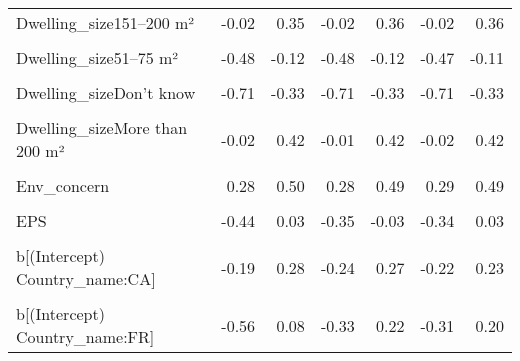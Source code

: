 \begin{table}
\begin{tabular}[t]{lrrrrrr}
Dwelling\_size151–200 m² & -0.02 & 0.35 & -0.02 & 0.36 & -0.02 & 0.36\\
\cellcolor{gray!10}{Dwelling\_size26–50 m²} & \cellcolor{gray!10}{-0.39} & \cellcolor{gray!10}{0.04} & \cellcolor{gray!10}{-0.40} & \cellcolor{gray!10}{0.04} & \cellcolor{gray!10}{-0.39} & \cellcolor{gray!10}{0.05}\\
Dwelling\_size51–75 m² & -0.48 & -0.12 & -0.48 & -0.12 & -0.47 & -0.11\\
\cellcolor{gray!10}{Dwelling\_size76–100 m²} & \cellcolor{gray!10}{-0.28} & \cellcolor{gray!10}{0.03} & \cellcolor{gray!10}{-0.28} & \cellcolor{gray!10}{0.03} & \cellcolor{gray!10}{-0.27} & \cellcolor{gray!10}{0.03}\\
Dwelling\_sizeDon't know & -0.71 & -0.33 & -0.71 & -0.33 & -0.71 & -0.33\\
\cellcolor{gray!10}{Dwelling\_sizeLess than 25 m²} & \cellcolor{gray!10}{-1.55} & \cellcolor{gray!10}{-0.57} & \cellcolor{gray!10}{-1.57} & \cellcolor{gray!10}{-0.55} & \cellcolor{gray!10}{-1.54} & \cellcolor{gray!10}{-0.56}\\
Dwelling\_sizeMore than 200 m² & -0.02 & 0.42 & -0.01 & 0.42 & -0.02 & 0.42\\
\cellcolor{gray!10}{Rural} & \cellcolor{gray!10}{-0.06} & \cellcolor{gray!10}{0.17} & \cellcolor{gray!10}{-0.06} & \cellcolor{gray!10}{0.17} & \cellcolor{gray!10}{-0.05} & \cellcolor{gray!10}{0.17}\\
Env\_concern & 0.28 & 0.50 & 0.28 & 0.49 & 0.29 & 0.49\\
\cellcolor{gray!10}{Gov\_support} & \cellcolor{gray!10}{6.52} & \cellcolor{gray!10}{17.30} & \cellcolor{gray!10}{6.56} & \cellcolor{gray!10}{16.98} & \cellcolor{gray!10}{6.48} & \cellcolor{gray!10}{16.97}\\
EPS & -0.44 & 0.03 & -0.35 & -0.03 & -0.34 & 0.03\\
\cellcolor{gray!10}{b[(Intercept) Country\_name:BE]} & \cellcolor{gray!10}{-0.37} & \cellcolor{gray!10}{0.09} & \cellcolor{gray!10}{-0.29} & \cellcolor{gray!10}{0.18} & \cellcolor{gray!10}{-0.28} & \cellcolor{gray!10}{0.19}\\
b[(Intercept) Country\_name:CA] & -0.19 & 0.28 & -0.24 & 0.27 & -0.22 & 0.23\\
\cellcolor{gray!10}{b[(Intercept) Country\_name:CH]} & \cellcolor{gray!10}{-0.08} & \cellcolor{gray!10}{0.53} & \cellcolor{gray!10}{-0.21} & \cellcolor{gray!10}{0.32} & \cellcolor{gray!10}{-0.21} & \cellcolor{gray!10}{0.33}\\
b[(Intercept) Country\_name:FR] & -0.56 & 0.08 & -0.33 & 0.22 & -0.31 & 0.20\\

\end{tabular}
\end{table}
